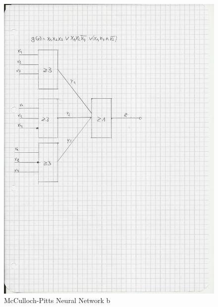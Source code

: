 \documentclass{scrartcl}
\begin{document}
\begin{figure}[ht]
\begin{center}
\includegraphics[scale=0.7]{Attachment2.jpg}
\end{center}
\caption{McCulloch-Pitts Neural Network b}
\label{Img:McCulloch-Pitts b}
\end{figure}
\end{document}
